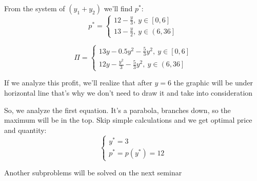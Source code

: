\documentclass[a4paper, 10pt]{article}
\begin{document}
From the system of $(y_1+y_2)$ we'll find $p^*$:
\begin{equation*}
    p^*=\begin{cases}
    12 - \frac{y}{3},\ y\in \left[0,6\right] \\
    13-\frac{y}{2},\ y\in \left(6,36\right]
\end{cases}
\end{equation*}

\begin{equation*}
    \Pi=\begin{cases}
        13y-0.5y^2-\displaystyle\frac{5}{3}y^2,\ y\in\left[0,6\right]\\
        12y-\displaystyle\frac{y^2}{3}-\frac{5}{3}y^2,\ y\in\left(6,36\right]
    \end{cases}
\end{equation*}

If we analyze this profit, we'll realize that after $y=6$ the graphic will be under horizontal line that's why we don't need to draw it and take into consideration

So, we analyze the first equation. It's a parabola, branches down, so the maximum will be in the top. Skip simple calculations and we get optimal price and quantity:
\begin{equation*}
    \begin{cases}
        y^*=3\\
        p^*=p(y^*)=12
    \end{cases}
\end{equation*}

Another subproblems will be solved on the next seminar
\end{document}
